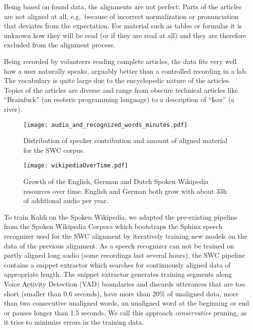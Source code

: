 \documentclass[a4paper]{article}
\begin{document}
Being based on found data, the alignments are not perfect: Parts of
the articles are not aligned at all, e.g.\ because of incorrect
normalization or pronunciation that deviates from the expectation.
For material such as tables or formulas it is unknown how
they will be read (or if they are read at all) and they are therefore
excluded from the alignment process. 

Being recorded by volunteers reading complete articles, the data fits
very well how a user naturally speaks, arguably better than a
controlled recording in a lab.  The vocabulary is quite large due to
the encyclopedic nature of the articles. 
Topics of the articles are diverse and range from obscure
technical articles like ``Brainfuck'' (an esoteric programming language)
to a description of ``Isar'' (a river).

\begin{figure}
  \centering
  \texttt{[image: audio\_and\_recognized\_words\_minutes.pdf]}
  \caption{Distribution of speaker contribution and amount of aligned material for the SWC corpus.}
  \label{fig:swc-audio-dist}
\end{figure}

\begin{figure}
  \centering
  \texttt{[image: wikipediaOverTime.pdf]}
  \caption{Growth of the English, German and Dutch Spoken Wikipedia resources over time. English and German both grow with about 33h of additional audio per year.}
  \label{fig:swc-over-time}
\end{figure}

To train Kaldi on the Spoken Wikipedia, we adapted the pre-existing
pipeline from the Spoken Wikipedia Corpora which bootstraps the Sphinx speech
recognizer \cite{sphinx2003} used for the SWC alignment by iteratively
training new models on the data of the previous alignment.
As a speech recognizer can not be trained on
partly aligned long audio (some recordings last several hours), the
SWC pipeline contains a snippet extractor which searches for
continuously aligned data of appropriate length. The snippet
extractor generates training segments along Voice Activity Detection (VAD) boundaries and discards
utterances that are too short (smaller than 0.6 seconds), have more
than 20\% of unaligned data, more than two consecutive unaligned words,
an unaligned word at the beginning or end
or pauses longer than 1.5 seconds.
We call this approach \emph{conservative} pruning, as
it tries to minimize errors in the training data.
\end{document}
